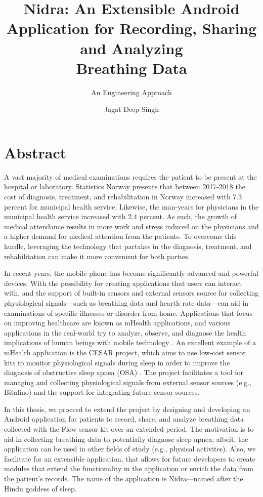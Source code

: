 \documentclass[UKenglish]{ifimaster}  %
\title{Nidra: An Extensible Android Application for Recording, Sharing and Analyzing \\ Breathing Data}
\subtitle{An Engineering Approach}
\author{Jagat Deep Singh}
\begin{document}
\duoforside[dept={Department of Informatics},   %
  program={Programming and Networks},  %
  long]                                        %

\frontmatter{}
\chapter*{Abstract}
 A vast majority of medical examinations requires the patient to be present at the hospital or laboratory. Statistics Norway \cite{ssb} presents that between 2017-2018 the cost of diagnosis, treatment, and rehabilitation in Norway increased with 7.3 percent for municipal health service. Likewise, the man-years for physicians in the municipal health service increased with 2.4 percent. As such, the growth of medical attendance results in more work and stress induced on the physicians and a higher demand for medical attention from the patients. To overcome this hurdle, leveraging the technology that partakes in the diagnosis, treatment, and rehabilitation can make it more convenient for both parties. 
 
 In recent years, the mobile phone has become significantly advanced and powerful devices. With the possibility for creating applications that users can interact with, and the support of built-in sensors and external sensors source for collecting physiological signals---such as breathing data and hearth rate data---can aid in examinations of specific illnesses or disorder from home. Applications that focus on improving healthcare are known as mHealth applications, and various applications in the real-world try to analyze, observe, and diagnose the health implications of human beings with mobile technology \cite{contactless_sleep, sam, mobilesleeplab}. An excellent example of a mHealth application is the CESAR project, which aims to use low-cost sensor kits to monitor physiological signals during sleep in order to improve the diagnosis of obstructive sleep apnea (OSA) \cite{cesar}. The project facilitates a tool for managing and collecting physiological signals from external sensor sources (e.g., Bitalino) and the support for integrating future sensor sources. 
 
 In this thesis, we proceed to extend the project by designing and developing an Android application for patients to record, share, and analyze breathing data collected with the Flow sensor kit over an extended period. The motivation is to aid in collecting breathing data to potentially diagnose sleep apnea; albeit, the application can be used in other fields of study (e.g., physical activites). Also, we facilitate for an extensible application, that allows for future developers to create modules that extend the functionality in the application or enrich the data from the patient's records. The name of the application is Nidra---named after the Hindu goddess of sleep.
\end{document}
